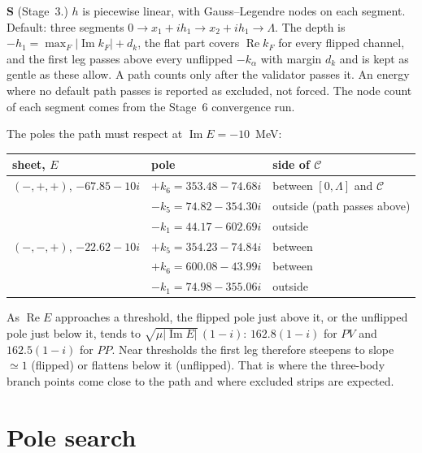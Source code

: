 \documentclass[11pt]{article}
\newcounter{stmt}
\newenvironment{stmt}[1]{\par\smallskip\refstepcounter{stmt}\noindent\textbf{S\thestmt}\enspace[\textsf{#1}]\enspace\ignorespaces}{\par\smallskip}
\begin{document}
\begin{stmt}{proposal}\label{st:shape}
(Stage~3.) $h$ is piecewise linear, with Gauss--Legendre nodes on each segment. Default: three segments $0\to x_1+ih_1\to x_2+ih_1\to\Lambda$. The depth is $-h_1=\max_F|\operatorname{Im}k_F|+d_k$, the flat part covers $\operatorname{Re}k_F$ for every flipped channel, and the first leg passes above every unflipped $-k_\alpha$ with margin $d_k$ and is kept as gentle as these allow. A path counts only after the validator passes it. An energy where no default path passes is reported as excluded, not forced. The node count of each segment comes from the Stage~6 convergence run.
\end{stmt}

The poles the path must respect at $\operatorname{Im}E=-10$~MeV:
\begin{center}
\begin{tabular}{lll}
\toprule
sheet, $E$ & pole & side of $\mathcal C$\\
\midrule
$(-,+,+)$, $-67.85-10i$ & $+k_6=353.48-74.68i$ & between $[0,\Lambda]$ and $\mathcal C$\\
 & $-k_5=74.82-354.30i$ & outside (path passes above)\\
 & $-k_1=44.17-602.69i$ & outside\\
$(-,-,+)$, $-22.62-10i$ & $+k_5=354.23-74.84i$ & between\\
 & $+k_6=600.08-43.99i$ & between\\
 & $-k_1=74.98-355.06i$ & outside\\
\bottomrule
\end{tabular}
\end{center}
As $\operatorname{Re}E$ approaches a threshold, the flipped pole just above it, or the unflipped pole just below it, tends to $\sqrt{\mu|\operatorname{Im}E|}\,(1-i)$: $162.8(1-i)$ for $PV$ and $162.5(1-i)$ for $PP$. Near thresholds the first leg therefore steepens to slope $\simeq1$ (flipped) or flattens below it (unflipped). That is where the three-body branch points come close to the path and where excluded strips are expected.

\section{Pole search}\label{sec:poles}
\end{document}
